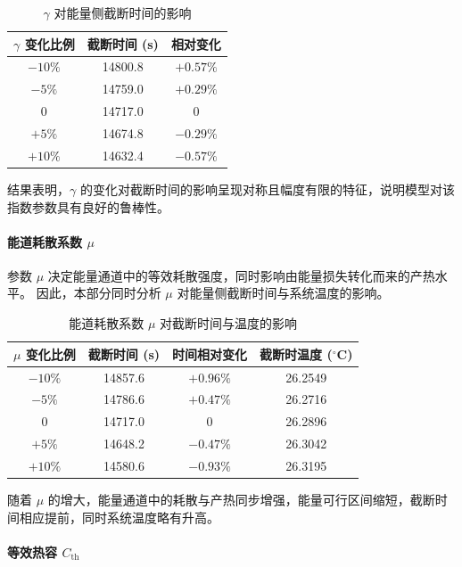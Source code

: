 \documentclass[11pt]{article}
\begin{document}
\begin{table}[H]
\centering
\caption{$\gamma$ 对能量侧截断时间的影响}
\begin{tabular}{ccc}
\hline
$\gamma$ 变化比例 & 截断时间 (s) & 相对变化 \\ \hline
$-10\%$ & 14800.8 & $+0.57\%$ \\
$-5\%$  & 14759.0 & $+0.29\%$ \\
$0$     & 14717.0 & $0$ \\
$+5\%$  & 14674.8 & $-0.29\%$ \\
$+10\%$ & 14632.4 & $-0.57\%$ \\ \hline
\end{tabular}
\end{table}

结果表明，$\gamma$ 的变化对截断时间的影响呈现对称且幅度有限的特征，说明模型对该指数参数具有良好的鲁棒性。

\paragraph{能道耗散系数 $\mu$}

参数 $\mu$ 决定能量通道中的等效耗散强度，同时影响由能量损失转化而来的产热水平。
因此，本部分同时分析 $\mu$ 对能量侧截断时间与系统温度的影响。

\begin{table}[H]
\centering
\caption{能道耗散系数 $\mu$ 对截断时间与温度的影响}
\begin{tabular}{cccc}
\hline
$\mu$ 变化比例 & 截断时间 (s) & 时间相对变化 & 截断时温度 ($^\circ$C) \\ \hline
$-10\%$ & 14857.6 & $+0.96\%$ & 26.2549 \\
$-5\%$  & 14786.6 & $+0.47\%$ & 26.2716 \\
$0$     & 14717.0 & $0$       & 26.2896 \\
$+5\%$  & 14648.2 & $-0.47\%$ & 26.3042 \\
$+10\%$ & 14580.6 & $-0.93\%$ & 26.3195 \\ \hline
\end{tabular}
\end{table}

随着 $\mu$ 的增大，能量通道中的耗散与产热同步增强，能量可行区间缩短，截断时间相应提前，同时系统温度略有升高。

\paragraph{等效热容 $C_{\mathrm{th}}$}
\end{document}

